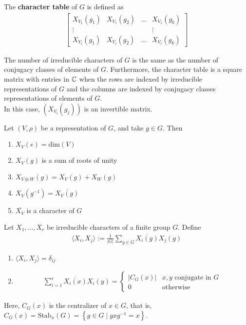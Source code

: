 \documentclass{memoir}
\begin{document}
\begin{defn}
	The \textbf{character table} of \(G\) is defined as
	\begin{align*}
		\begin{bmatrix} X_{V_1}(g_1) & X_{V_1}(g_2) & \ldots & X_{V_1}(g_k)\\
		\vdots & & & \vdots \\
	X_{V_\ell}(g_1) & X_{V_\ell}(g_2) & \ldots & X_{V_\ell}(g_k)\end{bmatrix} 
	\end{align*}
\end{defn}
The number of irreducible characters of \(G\) is the same as the number of conjugacy classes of elements of \(G\). Furthermore, the character table is a square matrix with entries in \(\mathbb{C}\) when the rows are indexed by irreducible representations of \(G\) and the columns are indexed by conjugacy classes representations of elements of \(G\).\\

In this case, \((X_{V_i}(g_j))\) is an invertible matrix.


\begin{prop}
	Let \((V,\rho )\) be a representation of \(G\), and take \(g \in G\). Then
	\begin{enumerate}
		\item \(X_V(e) = \textrm{dim}(V)\) 
		\item \(X_V(g)\) is a sum of roots of unity
		\item \(X_{V\oplus W}(g) = X_{V}(g) + X_{W}(g)\)
		\item \(X_V(g^{-1}) = \overline{X_V(g)}\) 
		\item \(\overline{X_V}\) is a character of \(G\)
	\end{enumerate}
\end{prop}

Let \(X_1,\ldots,X_r\) be irreducible characters of a finite group \(G\). Define
\begin{align*}
	\langle X_i, X_j \rangle := \frac{1}{\left| G \right| } \sum_{g \in G} \overline{X_i(g)}X_j(g)
\end{align*}

\begin{thm}
	\begin{enumerate}
		\item \(\langle X_i, X_j \rangle = \delta _{ij}\) 
		\item 
			\begin{align*}
				\sum_{i=1}^{r} \overline{X_i(x)}X_i(y) = \begin{cases}
					\left| C_G(x) \right| & x,y \text{ conjugate in }G\\
					0 & \text{otherwise}
				\end{cases}
			\end{align*}
	\end{enumerate}
\end{thm}
			Here, \(C_G(x)\) is the centralizer of \(x \in G\), that is, \(C_G(x) = \textrm{Stab}_x(G) = \left\{g \in G \mid g x g^{-1} = x \right\} \).
\end{document}
